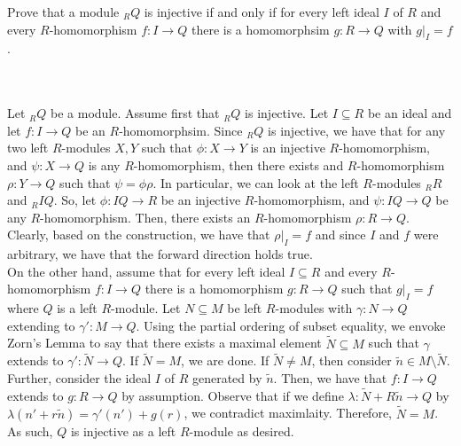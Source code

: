 Prove that a module $_RQ$ is injective if and only if for every left ideal $I$ of $R$ and every
$R$-homomorphism $f:I\to Q$ there is a homomorphsim $g:R\to Q$ with $g|_I=f$.\\\\

\begin{solution}\renewcommand{\qedsymbol}{}\ \\
    
    Let $_RQ$ be a module. Assume first that $_RQ$ is injective. Let $I\subseteq R$ be an ideal and let
    $f:I\to Q$ be an $R$-homomorphsim. Since $_RQ$ is injective, we have that for any two left
    $R$-modules $X,Y$ such that $\phi:X\to Y$ is an injective $R$-homomorphism, and $\psi:X\to Q$ is
    any $R$-homomorphism, then there exists and $R$-homomorphism $\rho:Y\to Q$ such that
    $\psi=\phi\rho$. In particular, we can look at the left $R$-modules $_RR$ and $_RIQ$. So, let
    $\phi:IQ\to R$ be an injective $R$-homomorphism, and $\psi:IQ\to Q$ be any $R$-homomorphism. Then,
    there exists an $R$-homomorphism $\rho:R\to Q$. Clearly, based on the construction, we have that
    $\rho|_I=f$ and since $I$ and $f$ were arbitrary, we have that the forward direction holds true.\\

    On the other hand, assume that for every left ideal $I\subseteq R$ and every $R$-homomorphism
    $f:I\to Q$ there is a homomorphism $g:R\to Q$ such that $g|_I=f$ where $Q$ is a left $R$-module. Let
    $N\subseteq M$ be left $R$-modules with $\gamma:N\to Q$ extending to $\gamma':M\to Q$. Using the
    partial ordering of subset equality, we envoke Zorn's Lemma to say that there exists a maximal
    element $\tilde{N}\subseteq M$ such that $\gamma$ extends to $\gamma':\tilde{N}\to Q$. If
    $\tilde{N}=M$, we are done. If $\tilde{N}\neq M$, then consider $\tilde{n}\in M\setminus\tilde{N}$.
    Further, consider the ideal $I$ of $R$ generated by $\tilde{n}$. Then, we have that $f:I\to Q$
    extends to $g:R\to Q$ by assumption. Observe that if we define $\lambda:\tilde{N}+R\tilde{n}\to Q$
    by $\lambda(n'+r\tilde{n})=\gamma'(n')+g(r)$, we contradict maximlaity. Therefore, $\tilde{N}=M$.
    As such, $Q$ is injective as a left $R$-module as desired.
 
\end{solution}